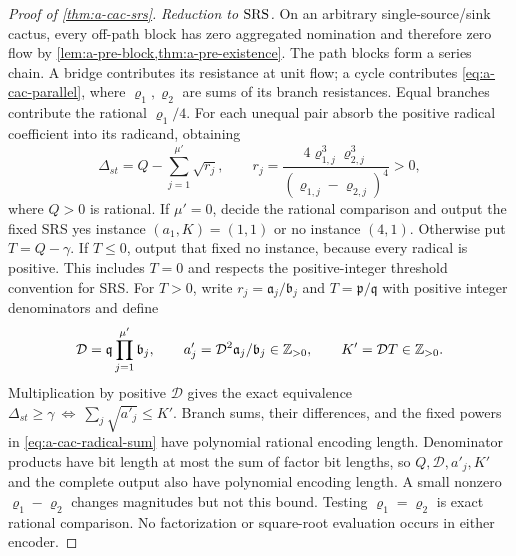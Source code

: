 \begin{proof}[Proof of \cref{thm:a-cac-srs}]
\emph{Reduction to $\mathrm{SRS}$.}
On an arbitrary single-source/sink cactus, every off-path block has
zero aggregated nomination and therefore zero flow by
\cref{lem:a-pre-block,thm:a-pre-existence}. The path blocks form a
series chain. A bridge contributes its resistance at unit flow; a
cycle contributes \cref{eq:a-cac-parallel}, where $\varrho_1,\varrho_2$ are sums of
its branch resistances. Equal branches contribute the rational $\varrho_1/4$.
For each unequal pair absorb the positive radical coefficient into
its radicand, obtaining
\begin{equation}
 \Delta_{st}=Q-\sum_{j=1}^{\mu'}\sqrt{r_j},\qquad
 r_j=\frac{4\varrho_{1,j}^3\varrho_{2,j}^3}{(\varrho_{1,j}-\varrho_{2,j})^4}>0,
 \label{eq:a-cac-radical-sum}
\end{equation}
where $Q>0$ is rational. If $\mu'=0$, decide the rational comparison and
output the fixed SRS yes instance $(a_1,K)=(1,1)$ or no instance
$(4,1)$. Otherwise put $T=Q-\gamma$. If $T\le0$, output that fixed
no instance, because every radical is positive. This includes $T=0$
and respects the positive-integer threshold convention for SRS.
For $T>0$, write $r_j=\mathfrak a_j/\mathfrak b_j$ and $T=\mathfrak p/\mathfrak q$ with positive integer
denominators and define
\[
 \mathcal D=\mathfrak q\prod_{j=1}^{\mu'} \mathfrak b_j,\qquad
 a'_j=\mathcal D^2\mathfrak a_j/\mathfrak b_j\in\mathbb{Z}_{>0},\qquad K'=\mathcal D T\in\mathbb{Z}_{>0}.
\]
Multiplication by positive $\mathcal D$ gives the exact equivalence
$\Delta_{st}\ge\gamma\ \Longleftrightarrow\ \sum_j\sqrt{a'_j}\le K'$.
Branch sums, their differences, and the fixed powers in
\cref{eq:a-cac-radical-sum} have polynomial rational encoding length.
Denominator products have bit length at most the sum of factor bit
lengths, so $Q,\mathcal D,a'_j,K'$ and the complete output also have polynomial
encoding length. A small nonzero $\varrho_1-\varrho_2$ changes magnitudes but not this
bound. Testing $\varrho_1=\varrho_2$ is exact rational comparison. No factorization or
square-root evaluation occurs in either encoder.
\end{proof}

